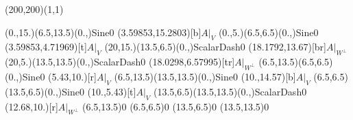 \unitlength=1bp%

\begin{feynartspicture}(200,200)(1,1)

\FADiagram{}
\FAProp(0.,15.)(6.5,13.5)(0.,){Sine}{0}
\FALabel(3.59853,15.2803)[b]{$A|_V$}
\FAProp(0.,5.)(6.5,6.5)(0.,){Sine}{0}
\FALabel(3.59853,4.71969)[t]{$A|_V$}
\FAProp(20,15.)(13.5,6.5)(0.,){ScalarDash}{0}
\FALabel(18.1792,13.67)[br]{$A|_{W^\perp}$}
\FAProp(20,5.)(13.5,13.5)(0.,){ScalarDash}{0}
\FALabel(18.0298,6.57995)[tr]{$A|_{W^\perp}$}
\FAProp(6.5,13.5)(6.5,6.5)(0.,){Sine}{0}
\FALabel(5.43,10.)[r]{$A|_V$}
\FAProp(6.5,13.5)(13.5,13.5)(0.,){Sine}{0}
\FALabel(10.,14.57)[b]{$A|_V$}
\FAProp(6.5,6.5)(13.5,6.5)(0.,){Sine}{0}
\FALabel(10.,5.43)[t]{$A|_V$}
\FAProp(13.5,6.5)(13.5,13.5)(0.,){ScalarDash}{0}
\FALabel(12.68,10.)[r]{$A|_{W^\perp}$}
\FAVert(6.5,13.5){0}
\FAVert(6.5,6.5){0}
\FAVert(13.5,6.5){0}
\FAVert(13.5,13.5){0}
\end{feynartspicture}

